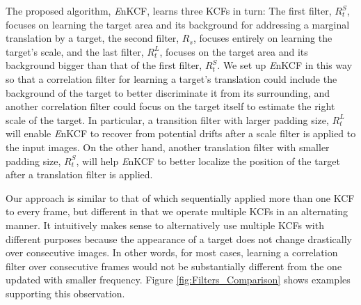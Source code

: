 \documentclass[10pt,twocolumn,letterpaper]{article}
\begin{document}
The proposed algorithm, {\it E}nKCF, learns three KCFs in turn: The
first filter, $R_{t}^{S}$, focuses on learning the target area and its
background for addressing a marginal translation by a target, the
second filter, $R_{s}$, focuses entirely on learning the target's
scale, and the last filter, $R_{t}^{L}$, focuses on the target area
and its background bigger than that of the first filter,
$R_{t}^{S}$. We set up {\it E}nKCF in this way so that a correlation
filter for learning a target's translation could include the
background of the target to better discriminate it from its
surrounding, and another correlation filter could focus on the target
itself to estimate the right scale of the target. In particular, a
transition filter with larger padding size, $R_{t}^{L}$ will enable
{\it E}nKCF to recover from potential drifts after a scale filter is
applied to the input images. On the other hand, another translation filter with
smaller padding size, $R_{t}^{S}$, will help {\it E}nKCF to better
localize the position of the target after a translation filter is
applied.

Our approach is similar to that of \cite{ma2015long} which
sequentially applied more than one KCF to every frame, but different
in that we operate multiple KCFs in an alternating manner. It
intuitively makes sense to alternatively use multiple KCFs with
different purposes because the appearance of a target does not change
drastically over consecutive images. In other words, for most cases,
learning a correlation filter over consecutive frames would not be
substantially different from the one updated with smaller
frequency. Figure \ref{fig:Filters_Comparison} shows examples
supporting this observation.

\end{document}
